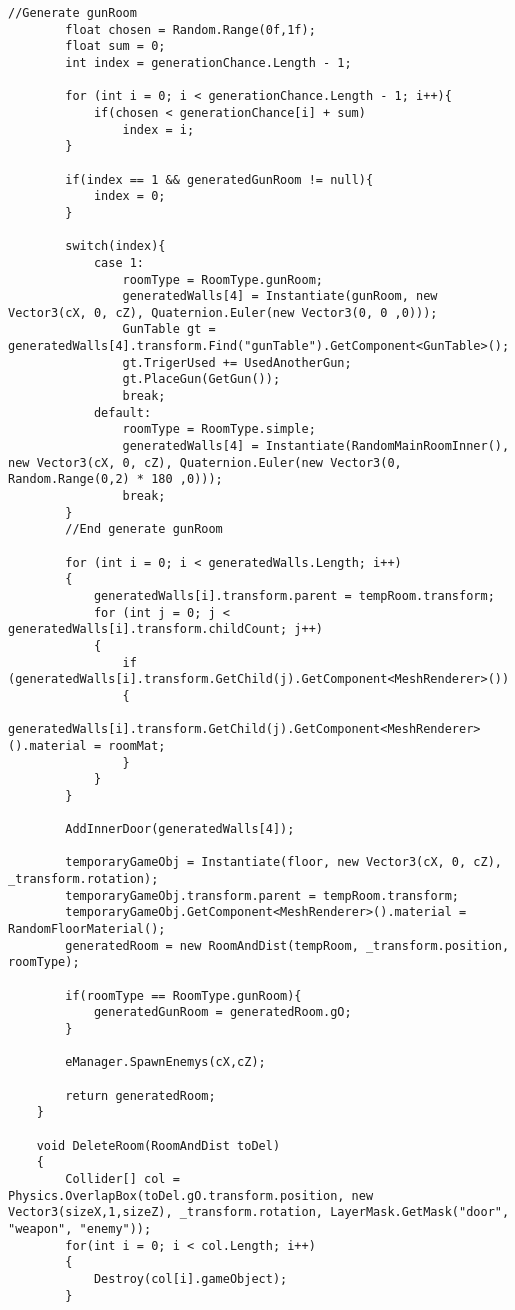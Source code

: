 \documentclass[14pt, titlepage,fleqn,a4paper]{extarticle}
\begin{document}
\begin{lstlisting}[caption= Генератор карты, label=lst:test]
        //Generate gunRoom
        float chosen = Random.Range(0f,1f);
        float sum = 0;
        int index = generationChance.Length - 1;

        for (int i = 0; i < generationChance.Length - 1; i++){
            if(chosen < generationChance[i] + sum)
                index = i;
        }

        if(index == 1 && generatedGunRoom != null){
            index = 0;
        }

        switch(index){
            case 1:
                roomType = RoomType.gunRoom;
                generatedWalls[4] = Instantiate(gunRoom, new Vector3(cX, 0, cZ), Quaternion.Euler(new Vector3(0, 0 ,0)));
                GunTable gt =  generatedWalls[4].transform.Find("gunTable").GetComponent<GunTable>();
                gt.TrigerUsed += UsedAnotherGun;
                gt.PlaceGun(GetGun());
                break;
            default:
                roomType = RoomType.simple;
                generatedWalls[4] = Instantiate(RandomMainRoomInner(), new Vector3(cX, 0, cZ), Quaternion.Euler(new Vector3(0, Random.Range(0,2) * 180 ,0)));
                break;
        }
        //End generate gunRoom

        for (int i = 0; i < generatedWalls.Length; i++)
        {
            generatedWalls[i].transform.parent = tempRoom.transform;
            for (int j = 0; j < generatedWalls[i].transform.childCount; j++)
            {
                if (generatedWalls[i].transform.GetChild(j).GetComponent<MeshRenderer>())
                {
                    generatedWalls[i].transform.GetChild(j).GetComponent<MeshRenderer>().material = roomMat;
                }
            }
        }

        AddInnerDoor(generatedWalls[4]);

        temporaryGameObj = Instantiate(floor, new Vector3(cX, 0, cZ), _transform.rotation);
        temporaryGameObj.transform.parent = tempRoom.transform;
        temporaryGameObj.GetComponent<MeshRenderer>().material = RandomFloorMaterial();
        generatedRoom = new RoomAndDist(tempRoom, _transform.position, roomType);
        
        if(roomType == RoomType.gunRoom){
            generatedGunRoom = generatedRoom.gO;
        }

        eManager.SpawnEnemys(cX,cZ);
        
        return generatedRoom;
    }

    void DeleteRoom(RoomAndDist toDel)
    {
        Collider[] col = Physics.OverlapBox(toDel.gO.transform.position, new Vector3(sizeX,1,sizeZ), _transform.rotation, LayerMask.GetMask("door", "weapon", "enemy"));
        for(int i = 0; i < col.Length; i++)
        {
            Destroy(col[i].gameObject);
        }


\end{lstlisting}
\end{document}
